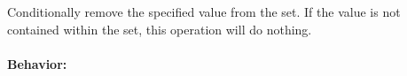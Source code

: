 Conditionally remove the specified value from the set.  If the value is not
contained within the set, this operation will do nothing.

\paragraph{Behavior:}
\begin{itemize}[noitemsep]


\end{itemize}

